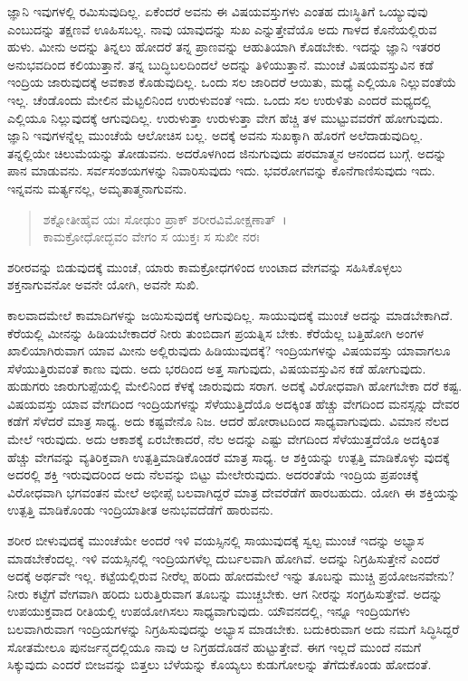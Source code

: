 ಜ್ಞಾನಿ ಇವುಗಳಲ್ಲಿ ರಮಿಸುವುದಿಲ್ಲ. ಏಕೆಂದರೆ ಅವನು ಈ ವಿಷಯವಸ್ತುಗಳು ಎಂತಹ ದುಃಸ್ಥಿತಿಗೆ ಒಯ್ಯುವುವು ಎಂಬುದನ್ನು ತಕ್ಷಣವೆ ಊಹಿಸಬಲ್ಲ. ನಾವು ಯಾವುದನ್ನು ಸುಖ ಎನ್ನುತ್ತೇವೆಯೊ ಅದು ಗಾಳದ ಕೊನೆಯಲ್ಲಿರುವ ಹುಳು. ಮೀನು ಅದನ್ನು ತಿನ್ನಲು ಹೋದರೆ ತನ್ನ ಪ್ರಾಣವನ್ನು ಆಹುತಿಯಾಗಿ ಕೊಡಬೇಕು. ಇದನ್ನು ಜ್ಞಾನಿ ಇತರರ ಅನುಭವದಿಂದ ಕಲಿಯುತ್ತಾನೆ. ತನ್ನ ಬುದ್ಧಿಬಲದಿಂದಲೆ ಅದನ್ನು ತಿಳಿಯುತ್ತಾನೆ. ಮುಂಚೆ ವಿಷಯವಸ್ತುವಿನ ಕಡೆ ಇಂದ್ರಿಯ ಜಾರುವುದಕ್ಕೆ ಅವಕಾಶ ಕೊಡುವುದಿಲ್ಲ. ಒಂದು ಸಲ ಜಾರಿದರೆ ಆಯಿತು, ಮಧ್ಯೆ ಎಲ್ಲಿಯೂ ನಿಲ್ಲುವಂತೆಯೆ ಇಲ್ಲ. ಚೆಂಡೊಂದು ಮೇಲಿನ ಮೆಟ್ಟಲಿನಿಂದ ಉರುಳುವಂತೆ ಇದು. ಒಂದು ಸಲ ಉರುಳಿತು ಎಂದರೆ ಮಧ್ಯದಲ್ಲಿ ಎಲ್ಲಿಯೂ ನಿಲ್ಲುವುದಕ್ಕೆ ಆಗುವುದಿಲ್ಲ. ಉರುಳುತ್ತಾ ಉರುಳುತ್ತಾ ವೇಗ ಹೆಚ್ಚಿ ತಳ ಮುಟ್ಟುವವರೆಗೆ ಹೋಗುವುದು. ಜ್ಞಾನಿ ಇವುಗಳನ್ನೆಲ್ಲ ಮುಂಚೆಯೆ ಆಲೋಚಿಸ ಬಲ್ಲ. ಅದಕ್ಕೆ ಅವನು ಸುಖಕ್ಕಾಗಿ ಹೊರಗೆ ಅಲೆದಾಡುವುದಿಲ್ಲ. ತನ್ನಲ್ಲಿಯೇ ಚಿಲುಮೆಯನ್ನು ತೋಡುವನು. ಅದರೊಳಗಿಂದ ಜಿನುಗುವುದು ಪರಮಾತ್ಮನ ಆನಂದದ ಬುಗ್ಗೆ. ಅದನ್ನು ಪಾನ ಮಾಡುವನು. ಸರ್ವಸಂಶಯಗಳನ್ನು ನಿವಾರಿಸುವುದು ಇದು. ಭವರೋಗವನ್ನು ಕೊನೆಗಾಣಿಸುವುದು ಇದು. ಇನ್ನವನು ಮರ್ತ್ಯನಲ್ಲ, ಅಮೃತಾತ್ಮನಾಗುವನು.

\begin{verse}
ಶಕ್ನೋತೀಹೈವ ಯಃ ಸೋಢುಂ ಪ್ರಾಕ್ ಶರೀರವಿಮೋಕ್ಷಣಾತ್~।\\ಕಾಮಕ್ರೋಧೋದ್ಭವಂ ವೇಗಂ ಸ ಯುಕ್ತಃ ಸ ಸುಖೀ ನರಃ 
\end{verse}

{\small ಶರೀರವನ್ನು ಬಿಡುವುದಕ್ಕೆ ಮುಂಚೆ, ಯಾರು ಕಾಮಕ್ರೋಧಗಳಿಂದ ಉಂಟಾದ ವೇಗವನ್ನು ಸಹಿಸಿಕೊಳ್ಳಲು ಶಕ್ತನಾಗುವನೋ ಅವನೇ ಯೋಗಿ, ಅವನೇ ಸುಖಿ.}

ಕಾಲವಾದಮೇಲೆ ಕಾಮಾದಿಗಳನ್ನು ಜಯಿಸುವುದಕ್ಕೆ ಆಗುವುದಿಲ್ಲ. ಸಾಯುವುದಕ್ಕೆ ಮುಂಚೆ ಅದನ್ನು ಮಾಡಬೇಕಾಗಿದೆ. ಕೆರೆಯಲ್ಲಿ ಮೀನನ್ನು ಹಿಡಿಯಬೇಕಾದರೆ ನೀರು ತುಂಬಿದಾಗ ಪ್ರಯತ್ನಿಸ ಬೇಕು. ಕೆರೆಯೆಲ್ಲ ಬತ್ತಿಹೋಗಿ ಅಂಗಳ ಖಾಲಿಯಾಗಿರುವಾಗ ಯಾವ ಮೀನು ಅಲ್ಲಿರುವುದು ಹಿಡಿಯುವುದಕ್ಕೆ? ಇಂದ್ರಿಯಗಳನ್ನು ವಿಷಯವಸ್ತು ಯಾವಾಗಲೂ ಸೆಳೆಯುತ್ತಿರುವಂತೆ ಕಾಣು ವುದು. ಅದು ಭರದಿಂದ ಅತ್ತ ಸಾಗುವುದು, ವಿಷಯವಸ್ತುವಿನ ಕಡೆ ಹೋಗುವುದು. ಹುಡುಗರು ಜಾರುಗುಪ್ಪೆಯಲ್ಲಿ ಮೇಲಿನಿಂದ ಕೆಳಕ್ಕೆ ಜಾರುವುದು ಸರಾಗ. ಅದಕ್ಕೆ ವಿರೋಧವಾಗಿ ಹೋಗಬೇಕಾ ದರೆ ಕಷ್ಟ. ವಿಷಯವಸ್ತು ಯಾವ ವೇಗದಿಂದ ಇಂದ್ರಿಯಗಳನ್ನು ಸೆಳೆಯುತ್ತಿದೆಯೊ ಅದಕ್ಕಿಂತ ಹೆಚ್ಚು ವೇಗದಿಂದ ಮನಸ್ಸನ್ನು ದೇವರ ಕಡೆಗೆ ಸೆಳೆದರೆ ಮಾತ್ರ ಸಾಧ್ಯ. ಅದು ಕಷ್ಟವೇನೊ ನಿಜ. ಆದರೆ ಹೋರಾಟದಿಂದ ಸಾಧ್ಯವಾಗುವುದು. ವಿಮಾನ ನೆಲದ ಮೇಲೆ ಇರುವುದು. ಅದು ಆಕಾಶಕ್ಕೆ ಏರಬೇಕಾದರೆ, ನೆಲ ಅದನ್ನು ಎಷ್ಟು ವೇಗದಿಂದ ಸೆಳೆಯುತ್ತದೆಯೊ ಅದಕ್ಕಿಂತ ಹೆಚ್ಚು ವೇಗವನ್ನು ವ್ಯತಿರಿಕ್ತವಾಗಿ ಉತ್ಪತ್ತಿಮಾಡಿಕೊಂಡರೆ ಮಾತ್ರ ಸಾಧ್ಯ. ಆ ಶಕ್ತಿಯನ್ನು ಉತ್ಪತ್ತಿ ಮಾಡಿಕೊಳ್ಳು ವುದಕ್ಕೆ ಅದರಲ್ಲಿ ಶಕ್ತಿ ಇರುವುದರಿಂದ ಅದು ನೆಲವನ್ನು ಬಿಟ್ಟು ಮೇಲೇರುವುದು. ಅದರಂತೆಯೆ ಇಂದ್ರಿಯ ಪ್ರಪಂಚಕ್ಕೆ ವಿರೋಧವಾಗಿ ಭಗವಂತನ ಮೇಲೆ ಅಭೀಪ್ಸೆ ಬಲವಾಗಿದ್ದರೆ ಮಾತ್ರ ದೇವರೆಡೆಗೆ ಹಾರಬಹುದು. ಯೋಗಿ ಈ ಶಕ್ತಿಯನ್ನು ಉತ್ಪತ್ತಿ ಮಾಡಿಕೊಂಡು ಇಂದ್ರಿಯಾತೀತ ಅನುಭವದೆಡೆಗೆ ಹಾರುವನು.

ಶರೀರ ಬೀಳುವುದಕ್ಕೆ ಮುಂಚೆಯೇ ಅಂದರೆ ಇಳಿ ವಯಸ್ಸಿನಲ್ಲಿ ಸಾಯುವುದಕ್ಕೆ ಸ್ವಲ್ಪ ಮುಂಚೆ ಇದನ್ನು ಅಭ್ಯಾಸ ಮಾಡಬೇಕೆಂದಲ್ಲ. ಇಳಿ ವಯಸ್ಸಿನಲ್ಲಿ ಇಂದ್ರಿಯಗಳೆಲ್ಲ ದುರ್ಬಲವಾಗಿ ಹೋಗಿವೆ. ಅದನ್ನು ನಿಗ್ರಹಿಸುತ್ತೇನೆ ಎಂದರೆ ಅದಕ್ಕೆ ಅರ್ಥವೇ ಇಲ್ಲ. ಕಟ್ಟೆಯಲ್ಲಿರುವ ನೀರೆಲ್ಲ ಹರಿದು ಹೋದಮೇಲೆ ಇನ್ನು ತೂಬನ್ನು ಮುಚ್ಚಿ ಪ್ರಯೋಜನವೇನು? ನೀರು ಕಟ್ಟೆಗೆ ವೇಗವಾಗಿ ಹರಿದು ಬರುತ್ತಿರುವಾಗ ತೂಬನ್ನು ಮುಚ್ಚಬೇಕು. ಆಗ ನೀರನ್ನು ಸಂಗ್ರಹಿಸುತ್ತೇವೆ. ಅದನ್ನು ಉಪಯುಕ್ತವಾದ ರೀತಿಯಲ್ಲಿ ಉಪಯೋಗಿಸಲು ಸಾಧ್ಯವಾಗುವುದು. ಯೌವನದಲ್ಲಿ, ಇನ್ನೂ ಇಂದ್ರಿಯಗಳು ಬಲವಾಗಿರುವಾಗ ಇಂದ್ರಿಯಗಳನ್ನು ನಿಗ್ರಹಿಸುವುದನ್ನು ಅಭ್ಯಾಸ ಮಾಡಬೇಕು. ಬದುಕಿರುವಾಗ ಅದು ನಮಗೆ ಸಿದ್ಧಿಸಿದ್ದರೆ ಸೋತಮೇಲೂ ಪುನರ್ಜನ್ಮದಲ್ಲಿಯೂ ನಾವು ಆ ನಿಗ್ರಹದೊಡನೆ ಹುಟ್ಟುತ್ತೇವೆ. ಈಗ ಇಲ್ಲದೆ ಮುಂದೆ ನಮಗೆ ಸಿಕ್ಕುವುದು ಎಂದರೆ ಬೀಜವನ್ನು ಬಿತ್ತಲು ಬೆಳೆಯನ್ನು ಕೊಯ್ಯಲು ಕುಡುಗೋಲನ್ನು ತೆಗೆದುಕೊಂಡು ಹೋದಂತೆ.

